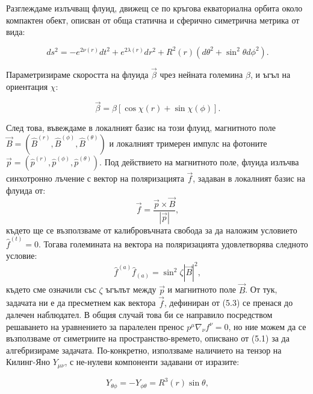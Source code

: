 \documentclass[12pt]{article}
\numberwithin{equation}{section}
\numberwithin{figure}{section}
\begin{document}
	Разглеждаме излъчващ флуид, движещ се по кръгова екваториална орбита около компактен обект, описван от обща статична и сферично симетрична метрика от вида:
	
	\begin{equation}
		ds^2 = - e^{2\nu(r)}dt^2 + e^{2\lambda(r)}dr^2 + R^2(r)\left(d\theta^2 + \sin^2\theta d\phi^2\right).
	\end{equation}
	
	Параметризираме скоростта на флуида $\vec{\beta}$ чрез нейната големина $\beta$, и ъгъл на ориентация $\chi$:
	
	\begin{equation}
		\vec{\beta} = \beta\left[\cos\chi (r) + \sin\chi (\phi)\right].
	\end{equation}
	
	След това, въвеждаме в локалният базис на този флуид, магнитното поле $\vec{B} = (\hat{B}^{(r)},\hat{B}^{(\phi)},\hat{B}^{(\theta)})$ и локалният тримерен импулс на фотоните $\vec{p} = \left(\hat{p}^{(r)},\hat{p}^{(\phi)},\hat{p}^{(\theta)}\right)$. Под действието на магнитното поле, флуида излъчва синхотронно лъчение с вектор на поляризацията $\vec{f}$, задаван в локалният базис на флуида от:
	\begin{equation}
		\vec{f} = \frac{\vec{p}\times\vec{B}}{|\vec{p}|},
	\end{equation}
	където ще се възползваме от калибровъчната свобода за да наложим условието $\hat{f}^{(t)} = 0$. Тогава големината на вектора на поляризацията удовлетворява следното условие:
	\begin{equation}
		\hat{f}^{(a)}\hat{f}_{(a)} = \sin^2\zeta|\vec{B}|^2,
	\end{equation}
	където сме означили със $\zeta$ ъгълът между $\vec{p}$ и магнитното поле $\vec{B}$. От тук, задачата ни е да пресметнем как вектора $\vec{f}$, дефиниран от (5.3) се пренася до далечен наблюдател. В общия случай това би се направило посредством решаването на уравнението за паралелен пренос $p^\mu\nabla_\nu f^\nu =0$, но ние можем да се възползваме от симетриите на пространство-времето, описвано от (5.1) за да алгебризираме задачата. По-конкретно, използваме наличието на тензор на Килинг-Яно $Y_{\mu\nu}$, с не-нулеви компоненти задавани от изразите:
	
	\begin{equation}
		Y_{\theta\phi} = -Y_{\phi\theta} = R^3(r)\sin\theta,
	\end{equation}
	
\end{document}
